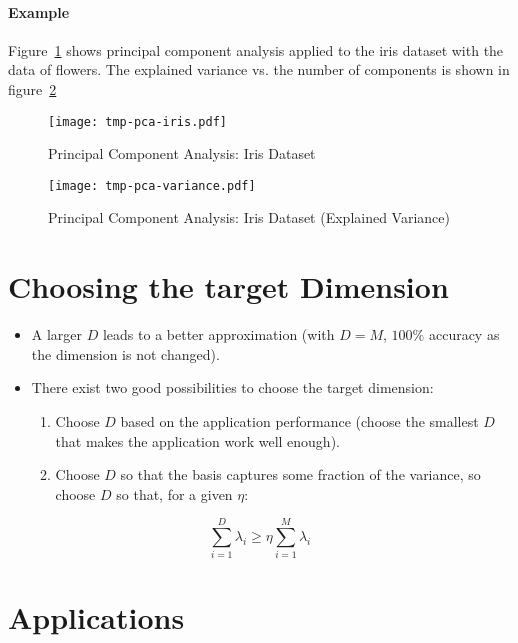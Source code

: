 			\paragraph{Example}
				Figure~\ref{fig:pcaIris} shows principal component analysis applied to the iris dataset with the data of flowers. The explained variance vs. the number of components is shown in figure~\ref{fig:pcaIrisVariance}
				
				\begin{figure}
					\centering
					\texttt{[image: tmp-pca-iris.pdf]}
					\caption{Principal Component Analysis: Iris Dataset}
					\label{fig:pcaIris}
				\end{figure}
				\begin{figure}
					\centering
					\texttt{[image: tmp-pca-variance.pdf]}
					\caption{Principal Component Analysis: Iris Dataset (Explained Variance)}
					\label{fig:pcaIrisVariance}
				\end{figure}

	\section{Choosing the target Dimension}
		\begin{itemize}
			\item A larger \(D\) leads to a better approximation (with \( D = M \), \(100\%\) accuracy as the dimension is not changed).
			\item There exist two good possibilities to choose the target dimension:
				\begin{enumerate}
					\item Choose \(D\) based on the application performance (choose the smallest \(D\) that makes the application work well enough).
					\item Choose \(D\) so that the basis captures some fraction of the variance, so choose \( D \) so that, for a given \( \eta \):
				\end{enumerate}
		\end{itemize}
		\begin{equation}
			\sum_{i = 1}^{D} \lambda_i \geq \eta \sum_{i = 1}^{M} \lambda_i
		\end{equation}

	\section{Applications} %
	
